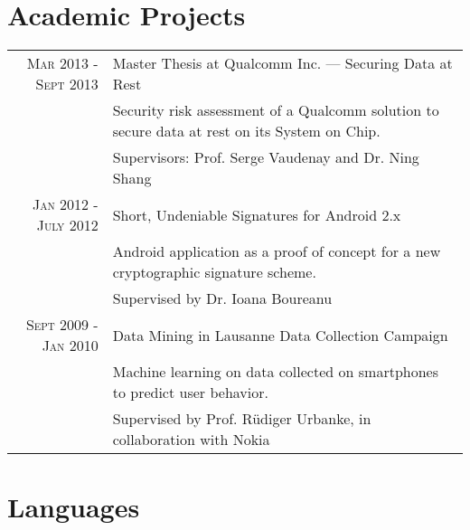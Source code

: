 \documentclass[a4paper,10pt]{article} %
\newcommand\Bot{\rule[-1.2ex]{0pt}{0pt}} %
\begin{document}

\section{Academic Projects}

\begin{tabular}{rl}
    \textsc{Mar 2013 - Sept 2013} & Master Thesis at Qualcomm Inc. --- Securing Data at Rest \\
                                  & \footnotesize{Security risk assessment of a
Qualcomm solution to secure data at rest on its System on Chip.} \\
                                  & \footnotesize{Supervisors: Prof. Serge Vaudenay and
Dr. Ning Shang}\Bot\\
    

    \textsc{Jan 2012 - July 2012} & Short, Undeniable Signatures for Android 2.x\\
                                  & \footnotesize{Android application as a proof
                                      of concept for a new cryptographic signature
                                      scheme.} \\
                                  & \footnotesize{Supervised by Dr. Ioana Boureanu}\Bot\\

    \textsc{Sept 2009 - Jan 2010} & Data Mining in Lausanne Data Collection Campaign\\
                                  & \footnotesize{Machine learning on data collected on
                                      smartphones to predict user behavior.}\\
                                  & \footnotesize{Supervised by Prof. R\"{u}diger Urbanke, in
                                      collaboration with Nokia}\\
\end{tabular}


\section{Languages}
\end{document}
